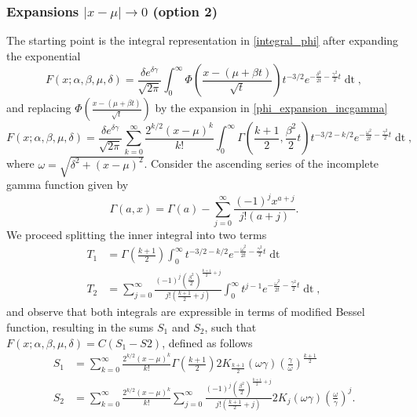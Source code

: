 \documentclass[10pt,a4paper,oneside]{article}
\numberwithin{equation}{section}
\begin{document}
\subsubsection{Expansions $|x-\mu| \to 0$ (option 2)}
The starting point is the integral representation in \eqref{integral_phi} after expanding the exponential
\begin{equation*}
F(x;\alpha, \beta, \mu, \delta) = \frac{\delta e^{\delta \gamma}}{\sqrt{2\pi}} \int_{0}^{\infty} \Phi\left(\frac{x - (\mu +\beta t)}{\sqrt{t}}\right) t^{-3/2} e^{-\frac{\delta^2}{2t} - \frac{\gamma^2}{2}t} \mathop{dt},
\end{equation*}
and replacing $\Phi\left(\frac{x - (\mu +\beta t)}{\sqrt{t}}\right)$ by the expansion in \eqref{phi_expansion_incgamma}
\begin{equation*}
F(x;\alpha, \beta, \mu, \delta) = \frac{\delta e^{\delta \gamma}}{\sqrt{2\pi}} \sum_{k=0}^{\infty}\frac{2^{k/2}(x-\mu)^k}{k!}\int_0^{\infty}\Gamma\left(\frac{k+1}{2}, \frac{\beta^2}{2}t\right) t^{-3/2-k/2} e^{-\frac{\omega^2}{2t} - \frac{\gamma^2}{2}t} \mathop{dt},
\end{equation*}
where $\omega = \sqrt{\delta^2 + (x-\mu)^2}$. Consider the ascending series of the incomplete gamma function given by \cite[\S 8.7]{NIST:DLMF}
\begin{equation}
\Gamma(a, x) = \Gamma(a) - \sum_{j=0}^{\infty} \frac{(-1)^j x^{a+j}}{j! (a+ j)}.
\end{equation}
We proceed splitting the inner integral into two terms
\begin{align}
T_1 &= \Gamma\left(\frac{k+1}{2}\right)\int_0^{\infty}t^{-3/2-k/2} e^{-\frac{\omega^2}{2t} - \frac{\gamma^2}{2}t} \mathop{dt}\\
T_2 &= \sum_{j=0}^{\infty} \frac{(-1)^j \left(\frac{\beta^2}{2}\right)^{\frac{k+1}{2}+j}}{j! (\frac{k+1}{2}+ j)}\int_0^{\infty} t^{j-1} e^{-\frac{\omega^2}{2t} - \frac{\gamma^2}{2}t} \mathop{dt},
\end{align}
and observe that both integrals are expressible in terms of modified Bessel function, resulting in the sums $S_1$ and $S_2$, such that $F(x;\alpha, \beta, \mu, \delta) = C (S_1 - S2)$, defined as follows
\begin{align}
S_1 &= \sum_{k=0}^{\infty}\frac{2^{k/2}(x-\mu)^k}{k!} \Gamma\left(\frac{k+1}{2}\right)2 K_{\frac{k+1}{2}}(\omega \gamma) \left(\frac{\gamma}{\omega}\right)^{\frac{k+1}{2}}\\
S_2 &= \sum_{k=0}^{\infty}\frac{2^{k/2}(x-\mu)^k}{k!}\sum_{j=0}^{\infty}\frac{(-1)^j \left(\frac{\beta^2}{2}\right)^{\frac{k+1}{2}+j}}{j! (\frac{k+1}{2}+ j)} 2 K_j(\omega \gamma) \left(\frac{\omega}{\gamma}\right)^j.
\end{align}
\end{document}

